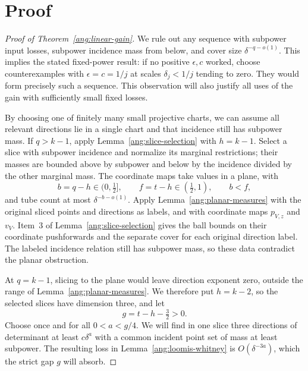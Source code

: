 \documentclass[11pt,reqno]{amsart}
\begin{document}
\section*{Proof}
\begin{proof}[Proof of Theorem~\ref{ang:linear-gain}]
We rule out any sequence with subpower input losses, subpower incidence
mass from below, and cover size $\delta^{-q-o(1)}$. This implies the
stated fixed-power result: if no positive $\epsilon,c$ worked, choose
counterexamples with $\epsilon=c=1/j$ at scales
$\delta_j<1/j$ tending to zero. They would form precisely such a
sequence. This observation will also justify all uses of the gain with
sufficiently small fixed losses.

By choosing one of finitely many small projective charts, we can assume
all relevant directions lie in a single chart and that incidence still
has subpower mass. If $q>k-1$, apply
Lemma~\ref{ang:slice-selection} with $h=k-1$. Select a slice with
subpower incidence and normalize its marginal restrictions; their
masses are bounded above by subpower and below by the incidence divided
by the other marginal mass. The coordinate maps take values in a plane, with
\[
 b=q-h\in(0,\tfrac12],\qquad
 f=t-h\in(\tfrac12,1),\qquad b<f,
\]
and tube count at most $\delta^{-b-o(1)}$. Apply
Lemma~\ref{ang:planar-measures} with the original sliced points and
directions as labels, and with coordinate maps $p_{V,z}$ and $v_V$.
Item~3 of Lemma~\ref{ang:slice-selection} gives the ball bounds on their
coordinate pushforwards and the separate cover for each original direction
label. The labeled incidence relation still has subpower mass, so these
data contradict the planar obstruction.

At $q=k-1$, slicing to the plane would leave direction exponent zero,
outside the range of Lemma~\ref{ang:planar-measures}. We therefore put
$h=k-2$, so the selected slices have dimension three, and let
\[
 g=t-h-\tfrac32>0.
\]
Choose once and for all $0<a<g/4$. We will find in one slice three
directions of determinant at least $c\delta^a$ with a common incident
point set of mass at least subpower. The resulting loss in
Lemma~\ref{ang:loomis-whitney} is $O(\delta^{-3a})$, which the
strict gap $g$ will absorb.


\end{proof}
\end{document}
